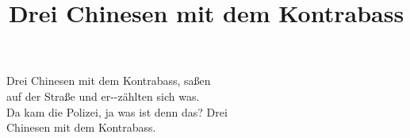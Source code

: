 \title{Drei Chinesen mit dem Kontrabass} 

 Drei Chinesen mit dem  Kontrabass, saßen \\ 
auf der Straße und er--zählten sich was. \\ 
Da kam die Polizei, ja was  ist denn das?  Drei \\ 
Chinesen mit dem  Kontrabass.

